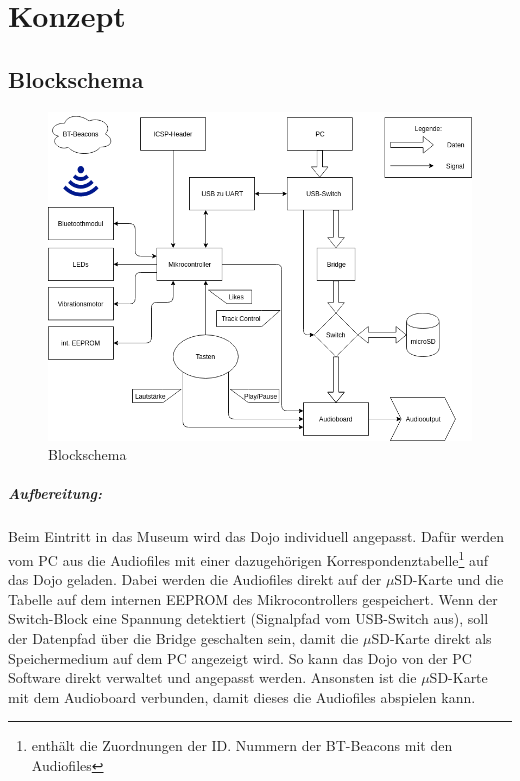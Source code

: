 \chapter{Konzept}
\thispagestyle{fancy} 
\section{Blockschema}
\begin{figure}[h]
\centering
\includegraphics[scale=1.1]{Bilder/p4_flowchart.png}
\caption{Blockschema}
\label{fig:flowchart}
\end{figure}
\vspace*{-0.6cm}
\paragraph*{Aufbereitung:}
Beim Eintritt in das Museum wird das Dojo individuell angepasst. Dafür werden vom PC aus die Audiofiles mit einer dazugehörigen Korrespondenztabelle\footnote{enthält die Zuordnungen der ID. Nummern der BT-Beacons mit den Audiofiles } auf das Dojo geladen. Dabei werden die Audiofiles direkt auf der $\mu$SD-Karte und die Tabelle auf dem internen EEPROM des Mikrocontrollers gespeichert. Wenn der Switch-Block eine Spannung detektiert (Signalpfad vom USB-Switch aus), soll der Datenpfad über die Bridge geschalten sein, damit die $\mu$SD-Karte direkt als Speichermedium auf dem PC angezeigt wird. So kann das Dojo von der PC Software direkt verwaltet und angepasst werden. Ansonsten ist die $\mu$SD-Karte mit dem Audioboard verbunden, damit dieses die Audiofiles abspielen kann.
\newpage
